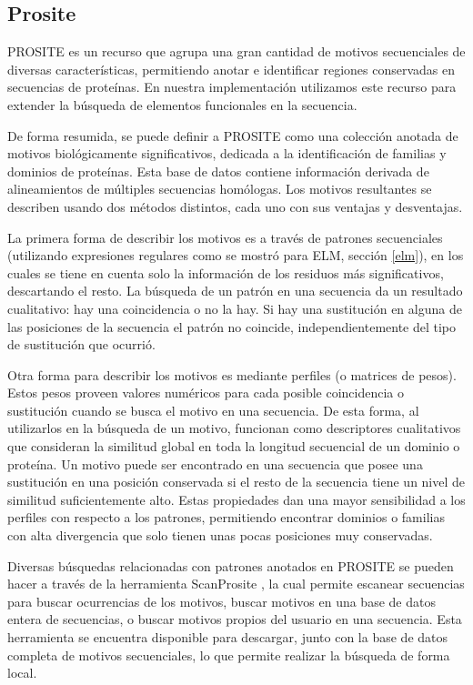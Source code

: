 \subsection{Prosite}\label{prosite}

PROSITE \cite{sigrist2002prosite,prositeWeb} es un recurso que agrupa una gran cantidad de motivos secuenciales de diversas características,
permitiendo anotar e identificar regiones conservadas en secuencias de proteínas.
En nuestra implementación utilizamos este recurso para extender la búsqueda de elementos funcionales en la secuencia.  

De forma resumida, se puede definir a PROSITE como una colección anotada de motivos biológicamente significativos, dedicada a la identificación de familias y dominios de proteínas.
Esta base de datos contiene información derivada de alineamientos de múltiples secuencias homólogas. 
Los motivos resultantes se describen usando dos métodos distintos, cada uno con sus ventajas y desventajas.

La primera forma de describir los motivos es a través de patrones secuenciales (utilizando expresiones regulares como se mostró para ELM, sección \ref{elm}),
en los cuales se tiene en cuenta solo la información de los residuos más significativos, descartando el resto. 
La búsqueda de un patrón en una secuencia da un resultado cualitativo: hay una coincidencia o no la hay. 
Si hay una sustitución en alguna de las posiciones de la secuencia el patrón no coincide, independientemente del tipo de sustitución que ocurrió.

Otra forma para describir los motivos es mediante perfiles (o matrices de pesos). Estos pesos proveen valores numéricos para cada posible coincidencia o sustitución cuando se busca el motivo en una secuencia. 
De esta forma, al utilizarlos en la búsqueda de un motivo, funcionan como descriptores cualitativos que consideran la similitud global en toda la longitud secuencial de un dominio o proteína. 
Un motivo puede ser encontrado en una secuencia que posee una sustitución en una posición conservada si el resto de la secuencia tiene un nivel de similitud suficientemente alto.
Estas propiedades dan una mayor sensibilidad a los perfiles con respecto a los patrones, permitiendo encontrar dominios o familias con alta divergencia que solo tienen unas pocas posiciones muy conservadas.

Diversas búsquedas relacionadas con patrones anotados en PROSITE se pueden hacer a través de la herramienta ScanProsite \cite{de2006scanprosite,scanprositeWeb}, 
la cual permite escanear secuencias para buscar ocurrencias de los motivos, buscar motivos en una base de datos entera de secuencias, o buscar motivos propios del usuario en una secuencia.
Esta herramienta se encuentra disponible para descargar, junto con la base de datos completa de motivos secuenciales, lo que permite realizar la búsqueda de forma local.

